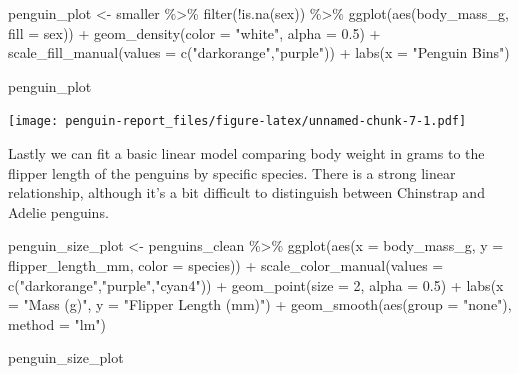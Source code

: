 \documentclass[
]{article}
\newenvironment{Shaded}{\begin{snugshade}}{\end{snugshade}}
\newcommand{\AttributeTok}[1]{\textcolor[rgb]{0.77,0.63,0.00}{#1}}
\newcommand{\DecValTok}[1]{\textcolor[rgb]{0.00,0.00,0.81}{#1}}
\newcommand{\FloatTok}[1]{\textcolor[rgb]{0.00,0.00,0.81}{#1}}
\newcommand{\FunctionTok}[1]{\textcolor[rgb]{0.00,0.00,0.00}{#1}}
\newcommand{\NormalTok}[1]{#1}
\newcommand{\OtherTok}[1]{\textcolor[rgb]{0.56,0.35,0.01}{#1}}
\newcommand{\SpecialCharTok}[1]{\textcolor[rgb]{0.00,0.00,0.00}{#1}}
\newcommand{\StringTok}[1]{\textcolor[rgb]{0.31,0.60,0.02}{#1}}
\begin{document}
\begin{Shaded}
\begin{Highlighting}[]
\NormalTok{penguin\_plot }\OtherTok{\textless{}{-}}\NormalTok{ smaller }\SpecialCharTok{\%\textgreater{}\%} 
  \FunctionTok{filter}\NormalTok{(}\SpecialCharTok{!}\FunctionTok{is.na}\NormalTok{(sex)) }\SpecialCharTok{\%\textgreater{}\%} 
  \FunctionTok{ggplot}\NormalTok{(}\FunctionTok{aes}\NormalTok{(body\_mass\_g, }\AttributeTok{fill =}\NormalTok{ sex)) }\SpecialCharTok{+} 
  \FunctionTok{geom\_density}\NormalTok{(}\AttributeTok{color =} \StringTok{"white"}\NormalTok{, }\AttributeTok{alpha =} \FloatTok{0.5}\NormalTok{) }\SpecialCharTok{+}
    \FunctionTok{scale\_fill\_manual}\NormalTok{(}\AttributeTok{values =} \FunctionTok{c}\NormalTok{(}\StringTok{"darkorange"}\NormalTok{,}\StringTok{"purple"}\NormalTok{)) }\SpecialCharTok{+}
  \FunctionTok{labs}\NormalTok{(}\AttributeTok{x =} \StringTok{"Penguin Bins"}\NormalTok{)}

\NormalTok{penguin\_plot}
\end{Highlighting}
\end{Shaded}

\texttt{[image: penguin-report\_files/figure-latex/unnamed-chunk-7-1.pdf]}

Lastly we can fit a basic linear model comparing body weight in grams to
the flipper length of the penguins by specific species. There is a
strong linear relationship, although it's a bit difficult to distinguish
between Chinstrap and Adelie penguins.

\begin{Shaded}
\begin{Highlighting}[]
\NormalTok{penguin\_size\_plot }\OtherTok{\textless{}{-}}\NormalTok{ penguins\_clean }\SpecialCharTok{\%\textgreater{}\%} 
  \FunctionTok{ggplot}\NormalTok{(}\FunctionTok{aes}\NormalTok{(}\AttributeTok{x =}\NormalTok{ body\_mass\_g, }\AttributeTok{y =}\NormalTok{ flipper\_length\_mm, }\AttributeTok{color =}\NormalTok{ species)) }\SpecialCharTok{+} 
  \FunctionTok{scale\_color\_manual}\NormalTok{(}\AttributeTok{values =} \FunctionTok{c}\NormalTok{(}\StringTok{"darkorange"}\NormalTok{,}\StringTok{"purple"}\NormalTok{,}\StringTok{"cyan4"}\NormalTok{)) }\SpecialCharTok{+}
  \FunctionTok{geom\_point}\NormalTok{(}\AttributeTok{size =} \DecValTok{2}\NormalTok{, }\AttributeTok{alpha =} \FloatTok{0.5}\NormalTok{) }\SpecialCharTok{+}
  \FunctionTok{labs}\NormalTok{(}\AttributeTok{x =} \StringTok{"Mass (g)"}\NormalTok{, }\AttributeTok{y =} \StringTok{"Flipper Length (mm)"}\NormalTok{) }\SpecialCharTok{+}
  \FunctionTok{geom\_smooth}\NormalTok{(}\FunctionTok{aes}\NormalTok{(}\AttributeTok{group =} \StringTok{"none"}\NormalTok{), }\AttributeTok{method =} \StringTok{"lm"}\NormalTok{)}

\NormalTok{penguin\_size\_plot}
\end{Highlighting}
\end{Shaded}
\end{document}
